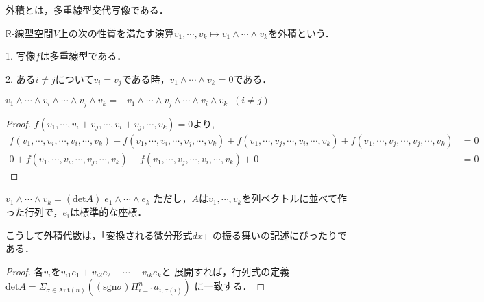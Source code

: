 \documentclass[uplatex, dvipdfmx]{jsreport}
\begin{document}
外積とは，多重線型交代写像である．
\begin{definition}
    $\mathbb{R}$-線型空間$V$上の次の性質を満たす演算$v_1,\cdots,v_k\mapsto v_1\wedge\cdots\wedge v_k$を外積という．
    \begin{center}
    \end{center}

    1. 写像$f$は多重線型である．

    2. ある$i\ne j$について$v_i=v_j$である時，$v_1\wedge\cdots\wedge v_k=0$である．
\end{definition}

\begin{proposition}[置換に対して歪対称である]
    $v_1\wedge\cdots\wedge v_i\wedge\cdots\wedge v_j\wedge v_k=-v_1\wedge\cdots\wedge v_j\wedge\cdots\wedge v_i\wedge v_k\;\;(i\ne j)$
\end{proposition}
\begin{proof}
    $f(v_1,\cdots,v_i+v_j,\cdots,v_i+v_j,\cdots,v_k)=0$より,
    \begin{align*}
        f(v_1,\cdots,v_i,\cdots,v_i,\cdots,v_k) + f(v_1,\cdots,v_i,\cdots,v_j,\cdots,v_k)+f(v_1,\cdots,v_j,\cdots,v_i,\cdots,v_k)+f(v_1,\cdots,v_j,\cdots,v_j,\cdots,v_k) &=0 \\
        0 + f(v_1,\cdots,v_i,\cdots,v_j,\cdots,v_k) + f(v_1,\cdots,v_j,\cdots,v_i,\cdots,v_k) + 0 & =0
    \end{align*}
\end{proof}

\begin{proposition}[行列式の特徴付け]
    $v_1\wedge\cdots\wedge v_k = (\mathrm{det}A)\;e_1\wedge\cdots\wedge e_k$
    ただし，$A$は$v_1,\cdots,v_k$を列ベクトルに並べて作った行列で，$e_i$は標準的な座標．
\end{proposition}
\begin{remark}
    こうして外積代数は，「変換される微分形式$dx$」の振る舞いの記述にぴったりである．
\end{remark}
\begin{proof}
    各$v_i$を$v_{i1}e_1+v_{i2}e_2+\cdots+v_{ik}e_k$と
    展開すれば，行列式の定義$\mathrm{det}A=\Sigma_{\sigma\in\mathrm{Aut}(n)}\left((\mathrm{sgn}\sigma)\Pi^n_{i=1}a_{i,\sigma(i)}\right)$
    に一致する．
\end{proof}
\end{document}
